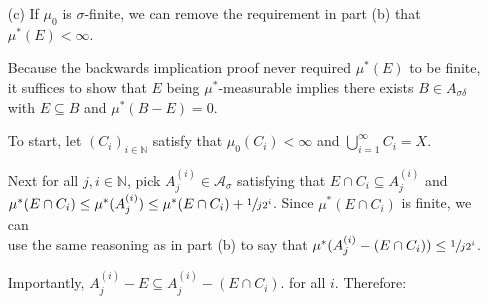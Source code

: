 \documentclass{book}
\newcommand{\exTwoP}{%
   \color{RedViolet}%
   \fontsize{13}{15}\selectfont%
}
\newenvironment{myIndent}{%
   \begin{adjustwidth}{2.5em}{0em}%
}{%
   \end{adjustwidth}%
}
\newcommand{\comp}{\mathsf{C}}
\newcommand{\retTwo}{\hfill\bigbreak}
\begin{document}
\begin{enumerate}
\begin{myIndent}
      To prove the reverse implication, suppose there exists a $\mu^*$-separable set $B$\\ satisfying that $E \subseteq B$ and $\mu^*(B - E) = 0$ (any set in $\mathcal{A}_{\sigma\delta}$ will be $\mu^*$-separable because $\mathcal{A}_{\sigma\delta} \subseteq \mathcal{M}(\mathcal{A})$). Then given any set $F$, we have that:

      {\centering 
      \begin{tabular}{l}
         $\mu^*(F - E) = \mu^*(F \cap E^\comp \cap B) + \mu^*(F \cap E^\comp \cap B^\comp)$\\ [2pt]
         $\phantom{\mu^*(F - E)} = \mu^*(F \cap (B - E)) + \mu^*(F - B) = 0 + \mu^*(F - B)$
      \end{tabular} \retTwo\par}

      Also, since $F \cap E \subseteq F \cap B$, we know that $\mu^*(F \cap E) \leq \mu^*(F \cap B)$.\retTwo

      So, $\mu^*(F \cap E) + \mu^*(F - E) \leq \mu^*(F \cap B) + \mu^*(F - B)  = \mu^*(F)$. Hence, $E$ is $\mu^*$-measurable.\newpage  
   \end{myIndent}

   \item[(c)] If $\mu_0$ is $\sigma$-finite, we can remove the requirement in part (b) that $\mu^*(E) < \infty$.
   
   \begin{myIndent}\exTwoP
      Because the backwards implication proof never required $\mu^*(E)$ to be finite, it suffices to show that $E$ being $\mu^*$-measurable implies there exists $B \in A_{\sigma\delta}$ with $E \subseteq B$ and $\mu^*(B - E) = 0$.\retTwo

      To start, let $(C_i)_{i \in \mathbb{N}}$ satisfy that $\mu_0(C_i) < \infty$ and $\bigcup\limits_{i = 1}^\infty C_i = X$.\retTwo
      
      Next for all $j, i \in \mathbb{N}$, pick $A_j^{(i)} \in \mathcal{A}_\sigma$ satisfying that $E \cap C_i \subseteq A_j^{(i)}$ and\\ [-2pt] $\mu^*(E \cap C_i) \leq \mu^*(A_j^{(i)}) \leq \mu^*(E \cap C_i) + \sfrac{1}{j2^{i}}$. Since $\mu^*(E \cap C_i)$ is finite, we can\\ use the same reasoning as in part (b) to say that $\mu^*(A_j^{(i)} - (E \cap C_i)) \leq \sfrac{1}{j2^i}$.\retTwo

      Importantly, $A_j^{(i)} - E \subseteq A_j^{(i)} - (E \cap C_i)$. for all $i$. Therefore:
      

\end{myIndent}
\end{enumerate}
\end{document}

